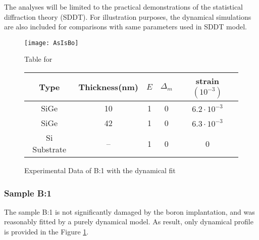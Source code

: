 The analyses will be limited to the practical demonstrations of the statistical diffraction theory (SDDT).  For illustration purposes, the dynamical simulations are also included for comparisons with same parameters used in SDDT model.

%
\begin{figure}[ht]
\caption{Experimental Data of B:1 with the dynamical fit}
\label{B1:fig}
\begin{minipage}{\linewidth}
\texttt{[image: AsIsBo]}
\end{minipage}
\vfill
\begin{minipage}{\linewidth}
\vspace{10pt}
\centering
Table for \\
\begin{tabular}[htbp]{@{}c|cccc@{}}
    \hline
  Type & Thickness(nm) & $E$ & $\Delta_m$ & strain $(10^{-3})$ \\
    \hline
  SiGe & 10 & 1 & 0 & $6.2\cdot 10^{-3}$  \\
  SiGe & 42 & 1 & 0 & $6.3\cdot 10^{-3}$  \\
  Si Substrate & -- & 1 & 0 & 0 
  \end{tabular}
 \end{minipage}
\end{figure}
%
\subsubsection{Sample B:1}

The sample B:1 is not significantly damaged by the boron implantation, and was reasonably fitted by a purely dynamical model.  As result, only dynamical profile is provided in the Figure \ref{B1:fig}.  


